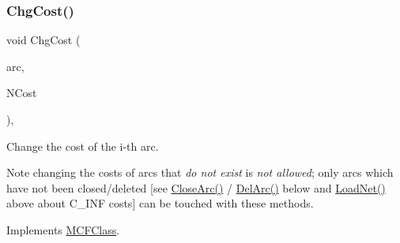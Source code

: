 \mbox{\label{class_m_c_f_cplex_a5b694b932ddb1fc61d9f3d66aaca10e1}} 
\subsubsection{\texorpdfstring{Chg\+Cost()}{ChgCost()}}
{\footnotesize\ttfamily void Chg\+Cost (\begin{DoxyParamCaption}\item[{\mbox{\hyperlink{class_m_c_f_class_ad53d6229d7ec28555a9c9c2fd9abf773}{Index}}}]{arc,  }\item[{\mbox{\hyperlink{class_m_c_f_class_a07dbefeeb08c3f63073622411893eb76}{c\+C\+Number}}}]{N\+Cost }\end{DoxyParamCaption})\hspace{0.3cm}{\ttfamily [override]}, {\ttfamily [virtual]}}

Change the cost of the i-\/th arc.

\begin{DoxyNote}{Note}
changing the costs of arcs that {\itshape do not exist} is {\itshape not allowed}; only arcs which have not been closed/deleted \mbox{[}see \mbox{\hyperlink{class_m_c_f_cplex_a4a964ce79159307998f5acd0018d01b1}{Close\+Arc()}} / \mbox{\hyperlink{class_m_c_f_cplex_a3b6145c95b83f40a76d724eb2b92f80f}{Del\+Arc()}} below and \mbox{\hyperlink{class_m_c_f_cplex_ac270d18d58fd6fe88164cde1f4c80aff}{Load\+Net()}} above about C\+\_\+\+I\+NF costs\mbox{]} can be touched with these methods. 
\end{DoxyNote}


Implements \mbox{\hyperlink{class_m_c_f_class_a41ab6d76a454b3f792665cce35a250f3}{M\+C\+F\+Class}}.

\mbox{\label{class_m_c_f_cplex_a1f8f2db739c0307ee7f4383972821e12}} 
